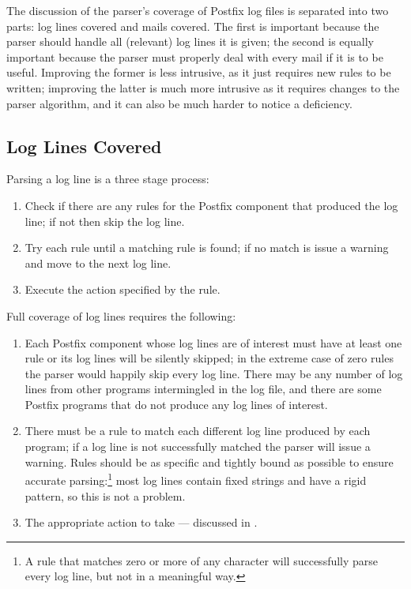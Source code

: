 \label{parsing coverage}

The discussion of the parser's coverage of Postfix log files is separated
into two parts: log lines covered and mails covered.  The first is
important because the parser should handle all (relevant) log lines it is
given; the second is equally important because the parser must properly
deal with every mail if it is to be useful.  Improving the former is
less intrusive, as it just requires new rules to be written; improving the
latter is much more intrusive as it requires changes to the parser
algorithm, and it can also be much harder to notice a deficiency.

\subsection{Log Lines Covered}

\label{log-lines-covered}

Parsing a log line is a three stage process:

\begin{enumerate}

    \item Check if there are any rules for the Postfix component that
        produced the log line; if not then skip the log line.

    \item Try each rule until a matching rule is found; if no match is
        issue a warning and move to the next log line.

    \item Execute the action specified by the rule.

\end{enumerate}

Full coverage of log lines requires the following:

\begin{enumerate}

    \item Each Postfix component whose log lines are of interest must have
        at least one rule or its log lines will be silently skipped; in the
        extreme case of zero rules the parser would happily skip every log
        line.  There may be any number of log lines from other programs
        intermingled in the log file, and there are some Postfix programs
        that do not produce any log lines of interest.

    \item There must be a rule to match each different log line produced by
        each program; if a log line is not successfully matched the parser
        will issue a warning.  Rules should be as specific and tightly
        bound as possible to ensure accurate parsing:\footnote{A rule that
        matches zero or more of any character will successfully parse every
        log line, but not in a meaningful way.} most log lines contain
        fixed strings and have a rigid pattern, so this is not a problem.

    \item The appropriate action to take --- discussed in
        .

\end{enumerate}

